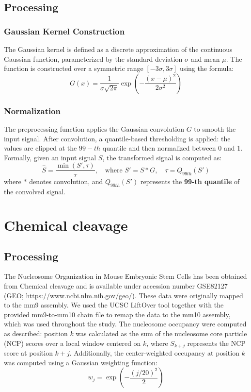 \documentclass[11pt]{book}
\begin{document}
\subsection{Processing}
\subsubsection{Gaussian Kernel Construction}
The Gaussian kernel is defined as a discrete approximation of the continuous Gaussian function, parameterized by the standard deviation \(\sigma\) and mean \(\mu\). The function is constructed over a symmetric range \([-3\sigma, 3\sigma]\) using the formula:
\begin{equation}
    G(x) = \frac{1}{\sigma \sqrt{2\pi}} \exp\left(-\frac{(x - \mu)^2}{2\sigma^2}\right)
\end{equation}

\subsubsection{Normalization}
The preprocessing function applies the Gaussian convolution $G$  to smooth the input signal. After convolution, a quantile-based thresholding is applied: the values are clipped at the $99-th$ quantile and then normalized between 0 and 1. Formally, given an input signal \( S \), the transformed signal is computed as:
\begin{equation}
    \hat{S} = \frac{\min(S', \tau)}{\tau}, \quad \text{where } S' = S * G, \quad \tau = Q_{99th}(S')
\end{equation}
where \( * \) denotes convolution, and \( Q_{99th}(S') \) represents the \textbf{99-th quantile} of the convolved signal.



\section{Chemical cleavage}
\subsection{Processing}
The Nucleosome Organization in Mouse Embryonic Stem Cells has been obtained from Chemical cleavage\cite{voong_insights_2016} and is available under accession number GSE82127 (GEO; https://www.ncbi.nlm.nih.gov/geo/). These data were originally mapped to the mm9 assembly. We used the UCSC LiftOver tool \cite{hinrichs_ucsc_2006} together with the provided mm9-to-mm10 chain file to remap the data to the mm10 assembly, which was used throughout the study.
The nucleosome occupancy were computed as described: position \( k \) was calculated as the sum of the nucleosome core particle (NCP) scores over 
a local window centered on \( k \), where \( S_{k+j} \) represents the NCP score at position \( k + j \). 
Additionally, the center-weighted occupancy at position \( k \) was computed using a Gaussian 
weighting function:
\[
w_j = \exp\left(-\frac{(j/20)^2}{2}\right)
\]
\end{document}
